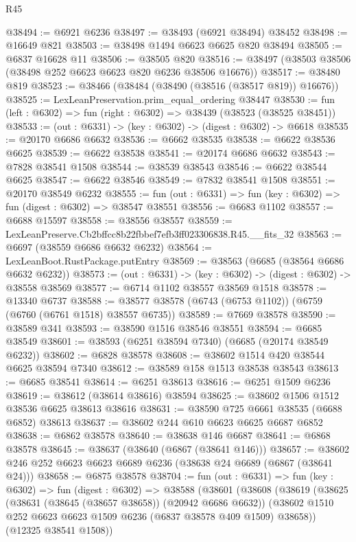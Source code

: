 \begin{lexlean}{R45}
\begin{coremodule}
{@38494 := @6921 @6236
@38497 := @38493 (@6921 @38494) @38452
@38498 := @16649 @821
@38503 := @38498 @1494 @6623 @6625 @820 @38494
@38505 := @6837 @16628 @11
@38506 := @38505 @820
@38516 := @38497 (@38503 @38506 (@38498 @252 @6623 @6623 @820 @6236 @38506 @16676))
@38517 := @38480 @819
@38523 := @38466 (@38484 (@38490 (@38516 (@38517 @819)) @16676))
@38525 := LexLeanPreservation.prim_equal_ordering @38447
@38530 := fun (left : @6302) => fun (right : @6302) => @38439 (@38523 (@38525 @38451))
@38533 := (out : @6331) -> (key : @6302) -> (digest : @6302) -> @6618
@38535 := @20170 @6686 @6632
@38536 := @6662 @38535
@38538 := @6622 @38536 @6625
@38539 := @6622 @38538
@38541 := @20174 @6686 @6632
@38543 := @7828 @38541 @1508
@38544 := @38539 @38543
@38546 := @6622 @38544 @6625
@38547 := @6622 @38546
@38549 := @7832 @38541 @1508
@38551 := @20170 @38549 @6232
@38555 := fun (out : @6331) => fun (key : @6302) => fun (digest : @6302) => @38547 @38551
@38556 := @6683 @1102
@38557 := @6688 @15597
@38558 := @38556 @38557
@38559 := LexLeanPreserve.Cb2bffcc8b22fbbef7efb3ff023306838.R45.__fits_32
@38563 := @6697 (@38559 @6686 @6632 @6232)
@38564 := LexLeanBoot.RustPackage.putEntry
@38569 := @38563 (@6685 (@38564 @6686 @6632 @6232))
@38573 := (out : @6331) -> (key : @6302) -> (digest : @6302) -> @38558 @38569
@38577 := @6714 @1102 @38557 @38569 @1518
@38578 := @13340 @6737
@38588 := @38577 @38578 (@6743 (@6753 @1102)) (@6759 (@6760 (@6761 @1518) @38557 @6735))
@38589 := @7669 @38578
@38590 := @38589 @341
@38593 := @38590 @1516 @38546 @38551
@38594 := @6685 @38549
@38601 := @38593 (@6251 @38594 @7340) (@6685 (@20174 @38549 @6232))
@38602 := @6828 @38578
@38608 := @38602 @1514 @420 @38544 @6625 @38594 @7340
@38612 := @38589 @158 @1513 @38538 @38543
@38613 := @6685 @38541
@38614 := @6251 @38613
@38616 := @6251 @1509 @6236
@38619 := @38612 (@38614 @38616) @38594
@38625 := @38602 @1506 @1512 @38536 @6625 @38613 @38616
@38631 := @38590 @725 @6661 @38535 (@6688 @6852) @38613
@38637 := @38602 @244 @610 @6623 @6625 @6687 @6852
@38638 := @6862 @38578
@38640 := @38638 @146 @6687
@38641 := @6868 @38578
@38645 := @38637 (@38640 (@6867 (@38641 @146)))
@38657 := @38602 @246 @252 @6623 @6623 @6689 @6236 (@38638 @24 @6689 (@6867 (@38641 @24)))
@38658 := @6875 @38578
@38704 := fun (out : @6331) =>
  fun (key : @6302) =>
  fun (digest : @6302) =>
  @38588
    (@38601
      (@38608
        (@38619
          (@38625
            (@38631 (@38645 (@38657 @38658)) (@20942 @6686 @6632))
            (@38602 @1510 @252 @6623 @6623 @1509 @6236 (@6837 @38578 @409 @1509) @38658))
          (@12325 @38541 @1508))
}
\end{coremodule}
\end{lexlean}
